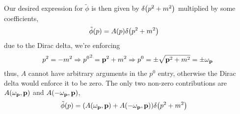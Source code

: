 Our desired expression for $\tilde\phi$ is then given by $\delta\qty(p^2+m^2)$ multiplied by some coefficients, 
\begin{align}
    \tilde\phi\qty(p)&=A\qty(p)\delta\qty(p^2+m^2)
\end{align}
due to the Dirac delta, we're enforcing \begin{align}p^2 = -m^2\Rightarrow {p^0}^2 = \vb p^2 + m^2\Rightarrow p^0 =\pm\sqrt{ \vb p^2 + m^2}=\pm\omega_{\vb p}\end{align} 
thus, $A$ cannot have arbitrary arguments in the $p^0$ entry, otherwise the Dirac delta would enforce it 
to be zero. The only two non-zero contributions are $A\qty(\omega_{\vb p},\vb p)$ and $A\qty(-\omega_{\vb p},\vb p)$, 
\begin{align}
    \tilde\phi\qty(p)&=\qty(A\qty(\omega_{\vb p},\vb p)+A\qty(-\omega_{\vb p},\vb p))\delta\qty(p^2+m^2)
\end{align}

